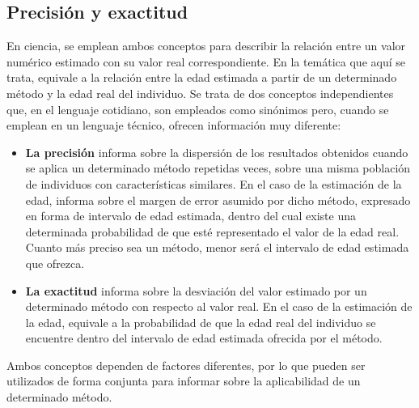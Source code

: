 \documentclass[a4paper,11pt]{article}
\begin{document}
\subsection{Precisión y exactitud}
En ciencia, se emplean ambos conceptos para describir la relación entre un valor numérico estimado con su valor real correspondiente. En la temática que aquí se trata, equivale a la relación entre la edad estimada a partir de un determinado método y la edad real del individuo. Se trata de dos conceptos independientes que, en el lenguaje cotidiano, son empleados como sinónimos pero, cuando se emplean en un lenguaje técnico, ofrecen información muy diferente:
\begin{itemize}
\item {\bf La precisión} informa sobre la dispersión de los resultados obtenidos cuando se aplica un determinado método repetidas veces, sobre una misma población de individuos con características similares. En el caso de la estimación de la edad, informa sobre el margen de error asumido por dicho método, expresado en forma de intervalo de edad estimada, dentro del cual existe una determinada probabilidad de que esté representado el valor de la edad real. Cuanto más preciso sea un método, menor será el intervalo de edad estimada que ofrezca.
\item {\bf La exactitud} informa sobre la desviación del valor estimado por un determinado método con respecto al valor real. En el caso de la estimación de la edad, equivale a la probabilidad de que la edad real del individuo se encuentre dentro del intervalo de edad estimada ofrecida por el método.
\end{itemize}
Ambos conceptos dependen de factores diferentes, por lo que pueden ser utilizados de forma conjunta para informar sobre la aplicabilidad de un determinado método.
\end{document}

